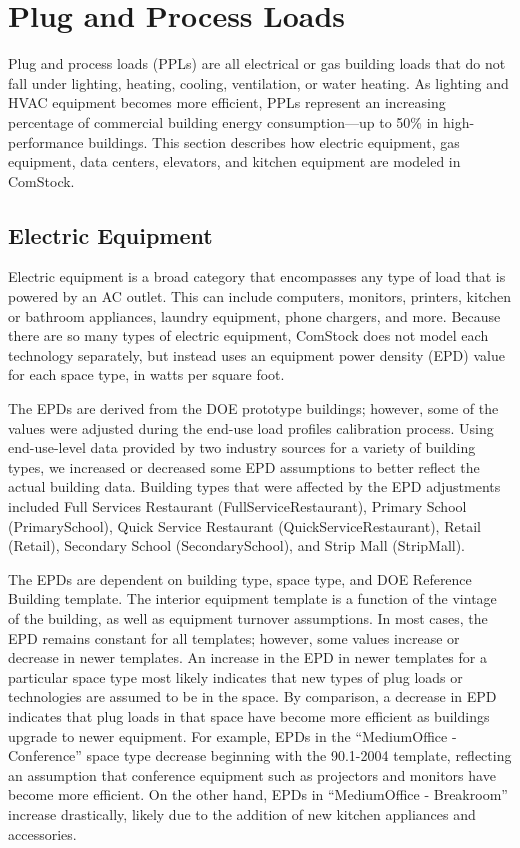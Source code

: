\section{Plug and Process Loads}
\label{sec:plug_and_process_loads}

Plug and process loads (PPLs) are all electrical or gas building loads that do not fall under lighting, heating, cooling, ventilation, or water heating. As lighting and HVAC equipment becomes more efficient, PPLs represent an increasing percentage of commercial building energy consumption---up to 50\% in high-performance buildings. This section describes how electric equipment, gas equipment, data centers, elevators, and kitchen equipment are modeled in ComStock. 

\subsection{Electric Equipment}

Electric equipment is a broad category that encompasses any type of load that is powered by an AC outlet. This can include computers, monitors, printers, kitchen or bathroom appliances, laundry equipment, phone chargers, and more. Because there are so many types of electric equipment, ComStock does not model each technology separately, but instead uses an equipment power density (EPD) value for each space type, in watts per square foot. 

The EPDs are derived from the DOE prototype buildings; however, some of the values were adjusted during the end-use load profiles calibration process. Using end-use-level data provided by two industry sources for a variety of building types, we increased or decreased some EPD assumptions to better reflect the actual building data. Building types that were affected by the EPD adjustments included Full Services Restaurant (FullServiceRestaurant), Primary School (PrimarySchool), Quick Service Restaurant (QuickServiceRestaurant), Retail (Retail), Secondary School (SecondarySchool), and Strip Mall (StripMall). 

The EPDs are dependent on building type, space type, and DOE Reference Building template. The interior equipment template is a function of the vintage of the building, as well as equipment turnover assumptions. In most cases, the EPD remains constant for all templates; however, some values increase or decrease in newer templates. An increase in the EPD in newer templates for a particular space type most likely indicates that new types of plug loads or technologies are assumed to be in the space. By comparison, a decrease in EPD indicates that plug loads in that space have become more efficient as buildings upgrade to newer equipment. For example, EPDs in the ``MediumOffice - Conference'' space type decrease beginning with the 90.1-2004 template, reflecting an assumption that conference equipment such as projectors and monitors have become more efficient. On the other hand, EPDs in ``MediumOffice - Breakroom'' increase drastically, likely due to the addition of new kitchen appliances and accessories. 

